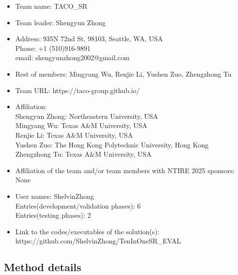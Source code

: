 \documentclass[10pt,twocolumn,letterpaper]{article}
\begin{document}
\begin{itemize}
\item Team name: TACO\_SR                                
\item Team leader: Shengyun Zhong                          
\item Address: 935N 72nd St, 98103, Seattle, WA, USA\\Phone: +1 (510)916-9891\\email: shengyunzhong2002@gmail.com
\item Rest of members: Mingyang Wu, Renjie Li, Yushen Zuo, Zhengzhong Tu      
\item Team URL: https://taco-group.github.io/                   
\item Affiliation:\\
      Shengyun Zhong: Northeastern University, USA \\
      Mingyang Wu: Texas A\&M University, USA \\
      Renjie Li: Texas A\&M University, USA \\
      Yushen Zuo: The Hong Kong Polytechnic University, Hong Kong \\
      Zhengzhong Tu: Texas A\&M University, USA
\item Affiliation of the team and/or team members with NTIRE 2025 sponsors: None
\item User names: ShelvinZhong \\
      Entries(development/validation phases): 6 \\
      Entries(testing phases): 2
\item Link to the codes/executables of the solution(s): https://github.com/ShelvinZhong/TenInOneSR\_EVAL
\end{itemize}

\subsection{Method details}
\end{document}
